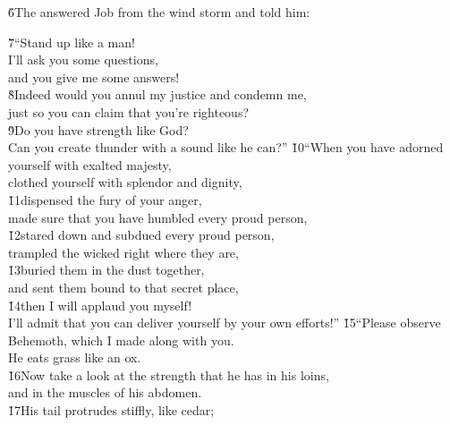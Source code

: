 \v{6}The  answered Job from the wind storm and told him:

\begin{poetry}
\poeml \v{7}``Stand up like a man! \\
\poemll    I'll ask you some questions, \\
\poemlll       and you give me some answers! \\
\poeml \v{8}Indeed would you annul my justice and condemn me, \\
\poemll    just so you can claim that you're righteous? \\
\poeml \v{9}Do you have strength like God? \\
\poemll    Can you create thunder with a sound like he can?''
\poeml \v{10}``When you have adorned yourself with exalted majesty, \\
\poemll    clothed yourself with splendor and dignity, \\
\poeml \v{11}dispensed the fury of your anger, \\
\poemll    made sure that you have humbled every proud person, \\
\poeml \v{12}stared down and subdued every proud person, \\
\poemll    trampled the wicked right where they are, \\
\poeml \v{13}buried them in the dust together, \\
\poemll    and sent them bound to that secret place, \\
\poeml \v{14}then I will applaud you myself! \\
\poemll    I'll admit that you can deliver yourself by your own efforts!''
\poeml \v{15}``Please observe Behemoth, which I made along with you. \\
\poemll    He eats grass like an ox. \\
\poeml \v{16}Now take a look at the strength that he has in his loins, \\
\poemll    and in the muscles of his abdomen. \\
\poeml \v{17}His tail protrudes stiffly, like cedar; \\

\end{poetry}
